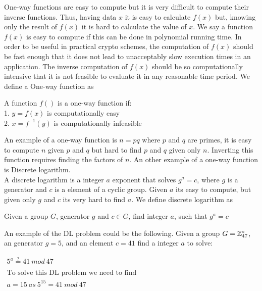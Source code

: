  One-way functions are easy to compute but it is very difficult to compute their inverse functions. Thus, having data $x$ it is easy to calculate $f(x)$ but,  
knowing only the result of $f(x)$ it is hard to calculate the value of $x$. We say a function $f(x)$ is easy to compute if this can be done in polynomial running time. 
In order to be useful in practical crypto schemes, the computation of $f(x)$ should be fast enough that it does not lead to unacceptably slow execution times in an application. The inverse
computation of $f(x)$ should be so computationally intensive that it is not feasible to evaluate it in any reasonable time period. We define a One-way function as \\

\begin{defi}
A function $f()$ is a one-way function if:      \\
1. $y = f (x)$ is computationally easy           \\
2. $x = f^{-1}(y)$ is computationally infeasible    
\end{defi}

\noindent
An example of a one-way function is $n = pq$ where $p$ and $q$ are primes, it is easy to compute $n$ given $p$ and $q$ but hard to find $p$ and $q$ given only $n$. 
Inverting this function requires finding the factors of $n$.
An other example of a one-way function is Discrete logarithm. \\


 A discrete logarithm is a integer $a$ exponent that solves $g^a=c$, where $g$ is a generator and $c$ is a element of a cyclic group. Given $a$ its easy to compute, but given only $g$ and $c$ its very hard to find $a$. We define discrete logarithm as \\

\begin{defi}
Given a group $G$, generator $g$ and $c \in G$, find integer $a$, such that $g^a = c$
\end{defi}

\noindent
An example of the DL problem could be the following. Given a group $G = \mathbb{Z}_{47}^*$, an generator $g=5$, and an element $c = 41$ find a integer $a$ to solve: 

\begin{center}
$
\begin{array}{l}
     5^a \stackrel{?}{=} 41 \ mod \ 47 \\
     \\
     \text{To solve this DL problem we need to find} \\
     a = 15 \ as \ 5^{15} = 41 \ mod \ 47
\end{array}
$
\end{center}

